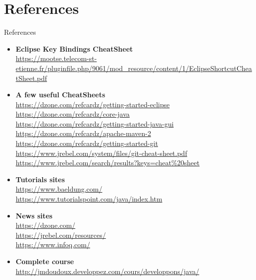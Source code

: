 \documentclass[English,c,%
hyperref={%
    pdftitle={FISA-DE2 OOP in Java},%
    pdfauthor={Muller, Gravier, Laforest, Subercaze},%
    pdfsubject={OOP in Java},%
    pdfkeywords={OOP, Java},%
    colorlinks=true,%
    urlcolor=blue,%
    linkcolor=%
    },%
xcolor={pdftex,svgnames} %
]{beamer}
\begin{document}
\section{References}

\begin{frame}{References}



{\tiny
\begin{itemize}

  \item \textbf{Eclipse Key Bindings CheatSheet}\\
  \url{https://mootse.telecom-st-etienne.fr/pluginfile.php/9061/mod_resource/content/1/EclipseShortcutCheatSheet.pdf}

  \item \textbf{A few useful CheatSheets}\\
  \url{https://dzone.com/refcardz/getting-started-eclipse}\\
  \url{https://dzone.com/refcardz/core-java}\\
  \url{https://dzone.com/refcardz/getting-started-java-gui} \\
  \url{https://dzone.com/refcardz/apache-maven-2} \\
  \url{https://dzone.com/refcardz/getting-started-git} \\
  \url{https://www.jrebel.com/system/files/git-cheat-sheet.pdf}\\
  \url{https://www.jrebel.com/search/results?keys=cheat\%20sheet}

  \item \textbf{Tutorials sites}\\
  \url{https://www.baeldung.com/}\\
  \url{https://www.tutorialspoint.com/java/index.htm}\\

  \item \textbf{News sites}\\
  \url{https://dzone.com/}\\
  \url{https://jrebel.com/resources/}\\
  \url{https://www.infoq.com/}

  \item \textbf{Complete course}\\
  \url{http://jmdoudoux.developpez.com/cours/developpons/java/}


\end{itemize}}
\end{frame}
\end{document}
